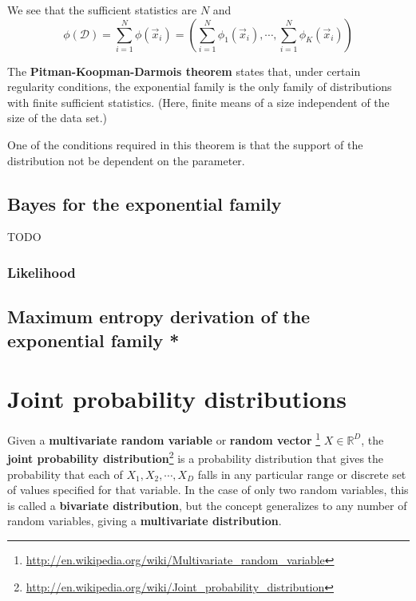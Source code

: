 We see that the sufficient statistics are $N$ and
\begin{equation}
\phi(\mathcal{D})=\sum\limits_{i=1}^N \phi(\vec{x}_i)=(\sum\limits_{i=1}^N \phi_1(\vec{x}_i),\cdots,\sum\limits_{i=1}^N \phi_K(\vec{x}_i))
\end{equation}

The \textbf{Pitman-Koopman-Darmois theorem} states that, under certain regularity conditions, the exponential family is the only family of distributions with finite sufficient statistics. (Here, finite means of a size independent of the size of the data set.)

One of the conditions required in this theorem is that the support of the distribution not be dependent on the parameter.


\subsection{Bayes for the exponential family}
\label{sec:Bayes-for-the-exponential-family}
TODO


\subsubsection{Likelihood}



\subsection{Maximum entropy derivation of the exponential family *}
\label{sec:Maximum-entropy-derivation-of-the-exponential-family}




\section{Joint probability distributions}
Given a \textbf{multivariate random variable} or \textbf{random vector} \footnote{\url{http://en.wikipedia.org/wiki/Multivariate_random_variable}} $X \in \mathbb{R}^D$, the \textbf{joint probability distribution}\footnote{\url{http://en.wikipedia.org/wiki/Joint_probability_distribution}} is a probability distribution that gives the probability that each of $X_1, X_2, \cdots,X_D$ falls in any particular range or discrete set of values specified for that variable. In the case of only two random variables, this is called a \textbf{bivariate distribution}, but the concept generalizes to any number of random variables, giving a \textbf{multivariate distribution}.

